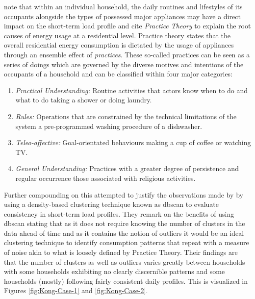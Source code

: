 \noindent \newline \citet{Stephen} note that within an individual household, the daily routines and lifestyles of its occupants alongside the types of possessed major appliances may have a direct impact on the short-term load profile and cite \textit{Practice Theory} \cite{Shove} to explain the root causes of energy usage at a residential level. Practice theory states that the overall residential energy consumption is dictated by the usage of appliances through an ensemble effect of \textit{practices}. These so-called practices can be seen as a series of doings which are governed by the diverse motives and intentions of the occupants of a household and can be classified within four major categories:

\begin{enumerate}
    \item \textit{Practical Understanding:} Routine activities that actors know when to do and what to do \eg taking a shower or doing laundry.
    \item \textit{Rules:} Operations that are constrained by the technical limitations of the system \eg a pre-programmed washing procedure of a dishwasher.
    \item \textit{Teleo-affective:} Goal-orientated behaviours \eg making a cup of coffee or watching TV.
    \item \textit{General Understanding:} Practices with a greater degree of persistence and regular occurrence \eg those associated with religious activities.
\end{enumerate}

\noindent \newline Further compounding on this \citet{Kong} attempted to justify the observations made by \citet{Stephen} by using a density-based clustering technique known as \gls{dbscan} \cite{Ester} to evaluate consistency in short-term load profiles. They remark on the benefits of using \gls{dbscan} stating that as it does not require knowing the number of clusters in the data ahead of time and as it contains the notion of outliers it would be an ideal clustering technique to identify consumption patterns that repeat with a measure of noise akin to what is loosely defined by Practice Theory. Their findings are that the number of clusters as well as outliers varies greatly between households with some households exhibiting no clearly discernible patterns and some households (mostly) following fairly consistent daily profiles. This is visualized in Figures \ref{fig:Kong-Case-1} and \ref{fig:Kong-Case-2}.

